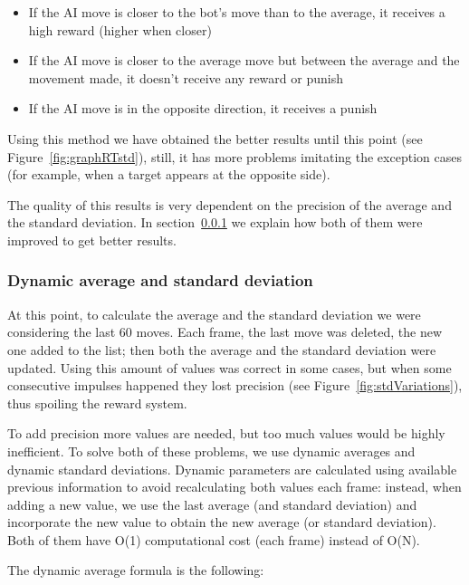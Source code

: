 \begin{itemize}
 \item If the AI move is closer to the bot's move than to the average, it receives a high reward (higher when closer)
 \item If the AI move is closer to the average move but between the average and the movement made, it doesn't receive any reward or punish
 \item If the AI move is in the opposite direction, it receives a punish
\end{itemize}

Using this method we have obtained the better results until this point (see Figure~\ref{fig:graphRTstd}), still, it has more problems imitating the exception cases (for example, when a target appears at the opposite side). 

The quality of this results is very dependent on the precision of the average and the standard deviation. In section~\ref{sec:dynamicstd} we explain how both of them were improved to get better results.

\subsubsection{Dynamic average and standard deviation}
\label{sec:dynamicstd}

At this point, to calculate the average and the standard deviation we were considering the last 60 moves. Each frame, the last move was deleted, the new one added to the list; then both the average and the standard deviation were updated. Using this amount of values was correct in some cases, but when some consecutive impulses happened they lost precision (see Figure~\ref{fig:stdVariations}), thus spoiling the reward system.

To add precision more values are needed, but too much values would be highly inefficient. To solve both of these problems, we use dynamic averages and dynamic standard deviations. Dynamic parameters are calculated using available previous information to avoid recalculating both values each frame: instead, when adding a new value, we use the last average (and standard deviation) and incorporate the new value to obtain the new average (or standard deviation). Both of them have O(1) computational cost (each frame) instead of O(N).

The dynamic average formula is the following:

\vspace{5mm}


